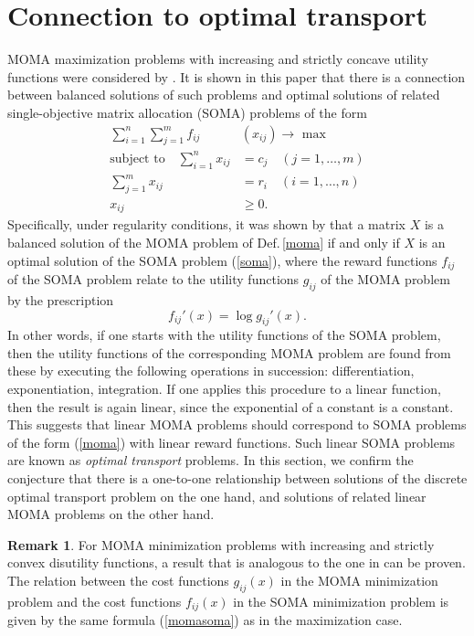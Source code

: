 \documentclass{article}
\theoremstyle{definition}
\newtheorem{remark}[theorem]{Remark}
\begin{document}
\section{Connection to optimal transport} \label{connection}

MOMA maximization problems with increasing and strictly concave utility functions were considered by \cite{Gale79}. It is shown in this paper that there is a connection between balanced solutions of such problems and optimal solutions of related single-objective matrix allocation (SOMA) problems of the form
\begin{subequations} \label{soma}
\begin{align}
\sum_{i=1}^n \sum_{j=1}^m f_{ij}& (x_{ij}) \rightarrow \text{ max} \\
\text{subject to} \quad \sum_{i=1}^n x_{ij} & = c_j \quad (j = 1,\dots,m) \\
\sum_{j=1}^m x_{ij} & = r_i \quad (i = 1,\dots,n) \\
x_{ij} & \geq 0.
\end{align}
\end{subequations}
Specifically, under regularity conditions, it was shown by \cite{Gale79} that a matrix $X$ is a balanced solution of the MOMA problem of Def.\,\ref{moma} if and only if $X$ is an optimal solution of the SOMA problem (\ref{soma}), where the reward functions $f_{ij}$ of the SOMA problem relate to the utility functions $g_{ij}$ of the MOMA problem by the prescription
\begin{equation} \label{momasoma}
f_{ij}'(x) = \log g_{ij}'(x).
\end{equation}
In other words, if one starts with the utility functions of the SOMA problem, then the utility functions of the corresponding MOMA problem are found from these by executing the following operations in succession: differentiation, exponentiation, integration. If one applies this procedure to a linear function, then the result is again linear, since the exponential of a constant is a constant. This suggests that linear MOMA problems should correspond to SOMA problems of the form (\ref{moma}) with linear reward functions. Such linear SOMA problems are known as \emph{optimal transport} problems. In this section, we confirm the conjecture that there is a one-to-one relationship between solutions of the discrete optimal transport problem on the one hand, and solutions of related linear MOMA problems on the other hand.

\begin{remark}
For MOMA minimization problems with increasing and strictly convex disutility functions, a result that is analogous to the one in \cite{Gale79} can be proven. The relation between the cost functions $g_{ij}(x)$ in the MOMA minimization problem and the cost functions $f_{ij}(x)$ in the SOMA minimization problem is given by the same formula (\ref{momasoma}) as in the maximization case.
\end{remark}
\end{document}
